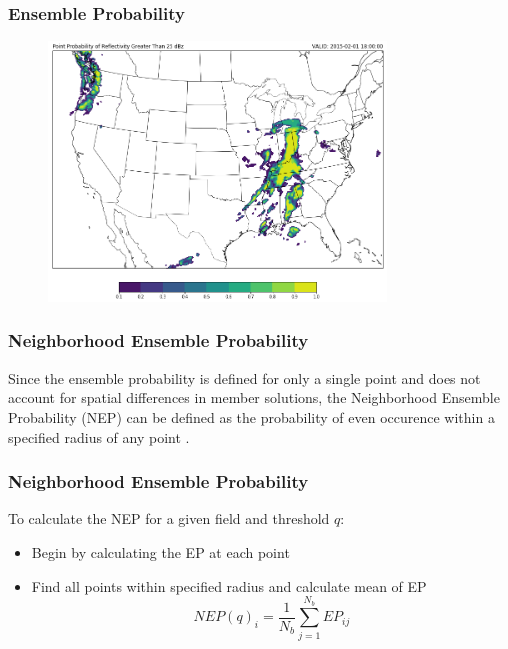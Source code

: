 \documentclass{beamer}
\begin{document}
\begin{frame}
  \frametitle{Ensemble Probability}
  \begin{figure}
    \includegraphics[width=0.8\textwidth]{probs}
\end{figure}
\end{frame}

\begin{frame}
  \frametitle{Neighborhood Ensemble Probability}
  Since the ensemble probability is defined for only a single point and does not account for spatial differences in member solutions, the Neighborhood Ensemble Probability (NEP) can be defined as the probability of even occurence within a specified radius of any point \citep{Schwartz2017}. 
\end{frame}

\begin{frame}
  \frametitle{Neighborhood Ensemble Probability}
  To calculate the NEP for a given field and threshold $q$:
  \begin{itemize}
    \item Begin by calculating the EP at each point
    \item Find all points within specified radius and calculate mean of EP
    \begin{equation}
      NEP(q)_{i} = \frac{1}{N_b}\sum^{N_b}_{j=1}EP_{ij}
    \end{equation}
  \end{itemize}
\end{frame}
\end{document}
